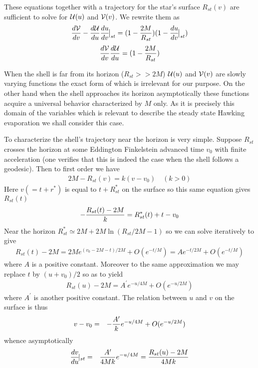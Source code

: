 \documentclass[12pt,oneside]{report}
\begin{document}
These equations together with a trajectory for the star's surface
$R_{st}(v)$ are sufficient to solve for 
$ {\cal{U}} (u)$ and $ {\cal{V}} (v)$. We
rewrite them as
\begin{equation}
{ d {\cal{V}}  \over dv} - {d {\cal{U}}  \over du} {du \over dv}\!\bigr\vert_{st}
= (1 - {2M \over R_{st}})(1 - {du \over dv}\!\bigl\vert_{st})
\label{E.2B}\end{equation}
\begin{equation}
{ d {\cal{V}}  \over dv}  {d {\cal{U}}  \over du}
= (1 - {2M \over R_{st}})\label{E.3B}\end{equation}

When the shell is far from its horizon ($R_{st}>>2M$)
$ {\cal{U}} (u)$ and $ {\cal{V}} (v)$ are slowly varying functions 
the exact form of
which is irrelevant for our purpose. On the other hand when the shell 
approaches its horizon asymptotically these functions acquire
a universal behavior characterized by $M$ only. 
As it is precisely this domain of the variables which is
relevant to describe the steady state Hawking evaporation we shall
consider this case. 

To characterize the shell's trajectory near the horizon is very
simple. Suppose $R_{st}$ crosses the horizon at some  
Eddington Finkelstein advanced
time $v_0$ with finite acceleration (one verifies that this is indeed the case 
when the shell follows a geodesic). 
Then to first order we have
\begin{eqnarray}
2M - R_{st}(v) = k (v - v_0) \quad (k>0)\label{E.4}
\end{eqnarray}
Here $v(=t + r^*)$ is equal to $t+R^*_{st}$ on the surface so this
same equation gives $R_{st}(t)$
\begin{eqnarray}
-{R_{st}(t)-2M \over k}=  R^*_{st}(t) + t - v_0 \label{E.5}
\end{eqnarray} 
Near the horizon $R^*_{st} \simeq 2M + 2M \ln (R_{st}/2M - 1) $ so
we can solve iteratively to give
\begin{eqnarray}
R_{st}(t)-2M =  2M e^{(v_0 -2M -t)/2M} + O(e^{-t/M})= A e^{-t/2M} +
O(e^{-t/M}) \label{E.6} \end{eqnarray}
where $A$ is a positive constant.
Moreover to the same approximation we may replace $t$ by
$(u+v_0)/2$ so as to yield 
\begin{eqnarray}
R_{st}(u)-2M =  A^\prime e^{ -u/4M}  + O(e^{-u/2M})
\label{E.7} \end{eqnarray}
where $A^\prime$ is another positive constant. The relation between $u$ and
$v$ on the surface is thus
\begin{eqnarray}
v- v_0 &=& -{A^\prime\over k} e^{ -u/4M} + O(e^{-u/2M})
\label{E.8b}\end{eqnarray}
whence asymptotically
\begin{eqnarray}
{dv \over du}\!\vert_{st} &=& {A^\prime\over 4 M  k} e^{ -u/4M}
=  {R_{st}(u) - 2M \over 4M k}
\label{E.8}\end{eqnarray}  
\end{document}
